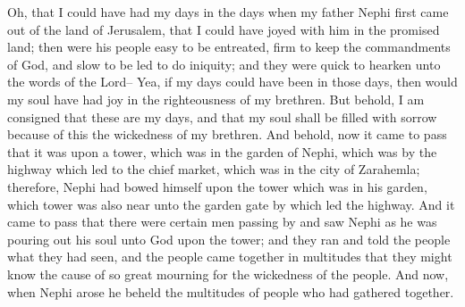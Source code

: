 Oh, that I could have had my days in the days when my father Nephi first came out of the land of Jerusalem, that I could have joyed with him in the promised land; then were his people easy to be entreated, firm to keep the commandments of God, and slow to be led to do iniquity; and they were quick to hearken unto the words of the Lord--
\bverse \iffalse Yea, if my days could have been in those days, then would my soul have had joy in the righteousness of my brethren. \fi
Yea, if my days could have been in those days, then would my soul have had joy in the righteousness of my brethren.
\bverse \iffalse But behold, I am consigned that these are my days, and that my soul shall be filled with sorrow because of this the wickedness of my brethren. \fi
But behold, I am consigned that these are my days, and that my soul shall be filled with sorrow because of this the wickedness of my brethren.
\bverse \iffalse And behold, now it came to pass that it was upon a tower, which was in the garden of Nephi, which was by the highway which led to the chief market, which was in the city of Zarahemla; therefore, Nephi had bowed himself upon the tower which was in his garden, which tower was also near unto the garden gate by which led the highway. \fi
And behold, now it came to pass that it was upon a tower, which was in the garden of Nephi, which was by the highway which led to the chief market, which was in the city of Zarahemla; therefore, Nephi had bowed himself upon the tower which was in his garden, which tower was also near unto the garden gate by which led the highway.
\bverse \iffalse And it came to pass that there were certain men passing by and saw Nephi as he was pouring out his soul unto God upon the tower; and they ran and told the people what they had seen, and the people came together in multitudes that they might know the cause of so great mourning for the wickedness of the people. \fi
And it came to pass that there were certain men passing by and saw Nephi as he was pouring out his soul unto God upon the tower; and they ran and told the people what they had seen, and the people came together in multitudes that they might know the cause of so great mourning for the wickedness of the people.
\bverse \iffalse And now, when Nephi arose he beheld the multitudes of people who had gathered together. \fi
And now, when Nephi arose he beheld the multitudes of people who had gathered together.
\bverse \iffalse And it came to pass that he opened his mouth and said unto them: Behold, why have ye gathered yourselves together? That I may tell you of your iniquities? \fi
